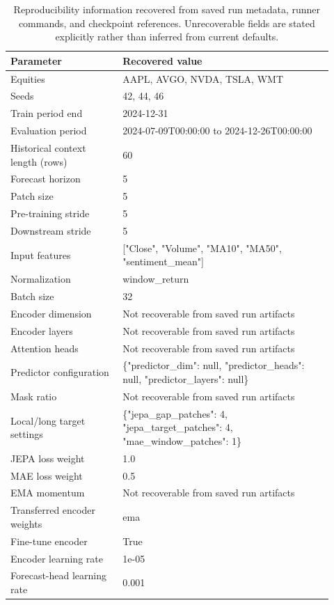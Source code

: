 \begin{table}[p]
\centering
\small
\caption{Reproducibility information recovered from saved run metadata, runner commands, and checkpoint references. Unrecoverable fields are stated explicitly rather than inferred from current defaults.}
\label{tab:reproducibility}
\begin{tabular}{p{0.32\linewidth}p{0.60\linewidth}}
\toprule
Parameter & Recovered value \\
\midrule
Equities & AAPL, AVGO, NVDA, TSLA, WMT \\
Seeds & 42, 44, 46 \\
Train period end & 2024-12-31 \\
Evaluation period & 2024-07-09T00:00:00 to 2024-12-26T00:00:00 \\
Historical context length (rows) & 60 \\
Forecast horizon & 5 \\
Patch size & 5 \\
Pre-training stride & 5 \\
Downstream stride & 5 \\
Input features & ["Close", "Volume", "MA10", "MA50", "sentiment\_mean"] \\
Normalization & window\_return \\
Batch size & 32 \\
Encoder dimension & Not recoverable from saved run artifacts \\
Encoder layers & Not recoverable from saved run artifacts \\
Attention heads & Not recoverable from saved run artifacts \\
Predictor configuration & \{"predictor\_dim": null, "predictor\_heads": null, "predictor\_layers": null\} \\
Mask ratio & Not recoverable from saved run artifacts \\
Local/long target settings & \{"jepa\_gap\_patches": 4, "jepa\_target\_patches": 4, "mae\_window\_patches": 1\} \\
JEPA loss weight & 1.0 \\
MAE loss weight & 0.5 \\
EMA momentum & Not recoverable from saved run artifacts \\
Transferred encoder weights & ema \\
Fine-tune encoder & True \\
Encoder learning rate & 1e-05 \\
Forecast-head learning rate & 0.001 \\

\end{tabular}
\end{table}
